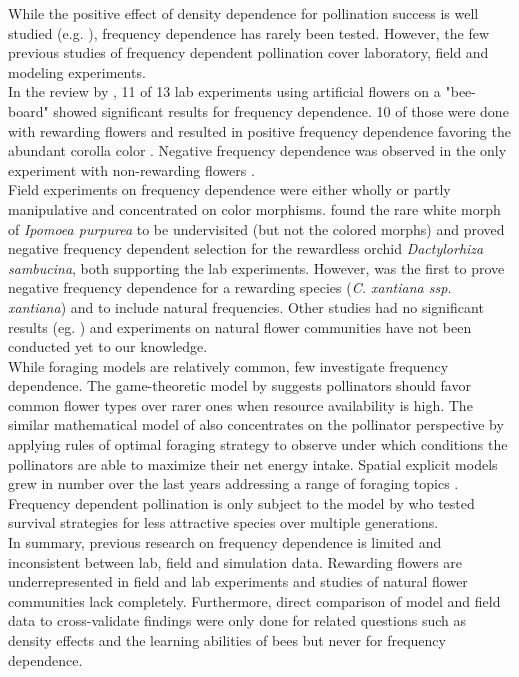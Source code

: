 While the positive effect of density dependence for pollination success is well studied (e.g. \citealt{essenberg2012explaining,bernhardt2008effects,kunin1993sex,morris2010benefit}), frequency dependence has rarely been tested. However, the few previous studies of frequency dependent pollination cover laboratory, field and modeling experiments. \\
In the review by \cite{smithson2001pollinator}, 11 of 13 lab experiments using artificial flowers on a "bee-board" showed significant results for frequency dependence. 10 of those were done with rewarding flowers and resulted in positive frequency dependence favoring the abundant corolla color \citep{smithson1996frequency,smithson1997density}.  Negative frequency dependence was observed in the only experiment with non-rewarding flowers \citep{smithson1997negative}. \\
Field experiments on frequency dependence were either wholly or partly manipulative and concentrated on color morphisms. \cite{epperson1987frequency} found the rare white morph of \textit{Ipomoea purpurea} to be undervisited (but not the colored morphs) and \cite{gigord2001negative} proved negative frequency dependent selection for the rewardless orchid \textit{Dactylorhiza sambucina}, both supporting the lab experiments. However, \cite{Eckhart2006frequency} was the first to prove negative frequency dependence for a rewarding species (\textit{C. xantiana ssp. xantiana}) and to include natural frequencies. Other studies had no significant results (eg. \citealt{jones1996pollinator, mogford1978pollination}) and experiments on natural flower communities have not been conducted yet to our knowledge.\\
While foraging models are relatively common, few investigate frequency dependence. The game-theoretic model by \cite{kunin1996pollinator} suggests pollinators should favor common flower types over rarer ones when resource availability is high. The similar mathematical model of \cite{song2014adaptive} also concentrates on the pollinator perspective by applying rules of optimal foraging strategy to observe under which conditions the pollinators are able to maximize their net energy intake. Spatial explicit models grew in number over the last years addressing a range of foraging topics \citep{dornhaus2006benefits,bukovac2013bees,faruq2013biological}. Frequency dependent pollination is only subject to the model by \cite{hanoteaux2013effects} who tested survival strategies for less attractive species over multiple generations. \\
In summary, previous research on frequency dependence is limited and inconsistent between lab, field and simulation data. Rewarding flowers are underrepresented in field and lab experiments and studies of natural flower communities lack completely.  Furthermore, direct comparison of model and field data to cross-validate findings were only done for related questions such as density effects \citep{essenberg2012explaining} and the learning abilities of bees \citep{dyer2014bee} but never for frequency dependence.\\

